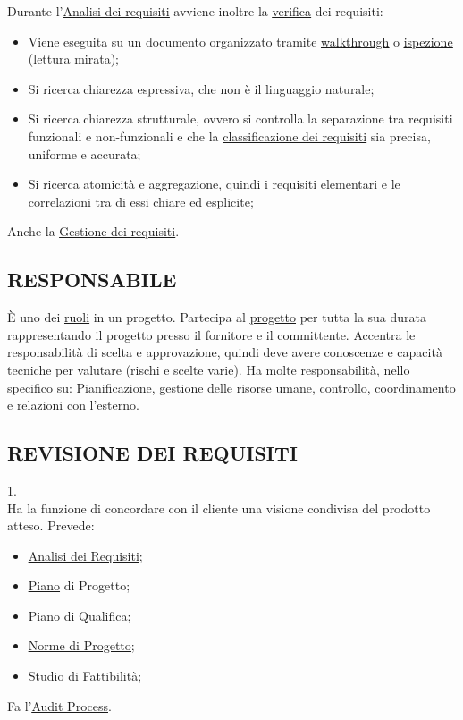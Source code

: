 		Durante l'\underline{\hyperref[analisideirequisiti]{Analisi dei requisiti}} avviene inoltre la \underline{\hyperref[verificare]{verifica}} dei requisiti:
			\begin{itemize}
				\item Viene eseguita su un documento organizzato tramite \underline{\hyperref[walkthrough]{walkthrough}} o \underline{\hyperref[inspection]{ispezione}} (lettura mirata);
				\item Si ricerca chiarezza espressiva, che non è il linguaggio naturale;
				\item Si ricerca chiarezza strutturale, ovvero si controlla la separazione tra requisiti funzionali e non-funzionali e che la \underline{\hyperref[classificazione]{classificazione dei requisiti}} sia precisa, uniforme e accurata;
				\item Si ricerca atomicità e aggregazione, quindi i requisiti elementari e le correlazioni tra di essi chiare ed esplicite;
			\end{itemize}
		
		Anche la \underline{\hyperref[gestionerequisiti]{Gestione dei requisiti}}.
		
		\subsection{RESPONSABILE}  \label{responsabile}
		È uno dei \underline{\hyperref[ruoli]{ruoli}} in un progetto. Partecipa al \underline{\hyperref[progetto]{progetto}} per tutta la sua durata rappresentando il progetto presso il fornitore e il committente. Accentra le responsabilità di scelta e approvazione, quindi deve avere conoscenze e capacità tecniche per valutare (rischi e scelte varie). Ha molte responsabilità, nello specifico su: \underline{\hyperref[pianificazione]{Pianificazione}}, gestione delle risorse umane, controllo, coordinamento e relazioni con l'esterno.
		
		\subsection{REVISIONE DEI REQUISITI}  \label{RR} 
		1. \\
		Ha la funzione di concordare con il cliente una visione condivisa del prodotto atteso.
		Prevede:
		\begin{itemize}
			\item \underline{\hyperref[analisideirequisiti]{Analisi dei Requisiti}};
			\item \underline{\hyperref[piano]{Piano}} di Progetto;
			\item Piano di Qualifica;
			\item \underline{\hyperref[norme]{Norme di Progetto}};
			\item \underline{\hyperref[studiofattibilita]{Studio di Fattibilità}};
		\end{itemize}
		Fa l'\underline{\hyperref[audit]{Audit Process}}.
		
